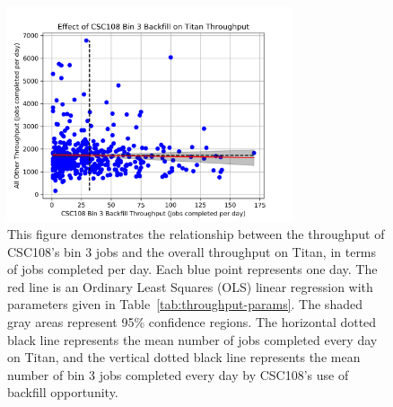\begin{figure}
  \includegraphics[width=0.75\textwidth]{images/linfit-throughput-bin3.png}
\caption{This figure demonstrates the relationship between the throughput of
CSC108's bin 3 jobs and the overall throughput on Titan, in terms of jobs
completed per day. Each blue point represents one day. The red line is an
Ordinary Least Squares (OLS) linear regression with parameters given in
Table~\ref{tab:throughput-params}. The shaded gray areas represent 95\%
confidence regions. The horizontal dotted black line represents the mean number
of jobs completed every day on Titan, and the vertical dotted black line
represents the mean number of bin 3 jobs completed every day by CSC108's use of
backfill opportunity.}
\label{fig:throughput-bin3}
\end{figure}

